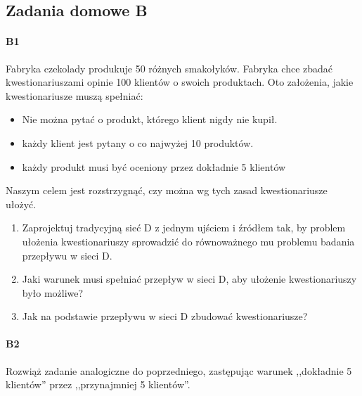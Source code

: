 \documentclass[a4paper,12pt]{article}
\theoremstyle{definition}%
\theoremstyle{definition}
\theoremstyle{problem}
\begin{document}
\subsection{Zadania domowe B}
\paragraph{B1} Fabryka czekolady produkuje 50 różnych smakołyków. Fabryka chce zbadać kwestionariuszami opinie 100 klientów o swoich produktach. Oto założenia, jakie kwestionariusze muszą
spełniać:
\begin{itemize}
\item Nie można pytać o produkt, którego klient nigdy nie kupił.
\item każdy klient jest pytany o co najwyżej 10 produktów.
\item każdy produkt musi być oceniony przez dokładnie 5 klientów
\end{itemize}
Naszym celem jest rozstrzygnąć, czy można wg tych zasad kwestionariusze ułożyć.
\begin{enumerate}[label=\alph*)]
\item Zaprojektuj tradycyjną sieć D z jednym ujściem i źródłem tak, by problem ułożenia kwestionariuszy
sprowadzić do równoważnego mu problemu badania przepływu w sieci D.
\item Jaki warunek musi spełniać przepływ w sieci D, aby ułożenie kwestionariuszy było możliwe?
\item Jak na podstawie przepływu w sieci D zbudować kwestionariusze?
\end{enumerate}

\paragraph{B2} Rozwiąż zadanie analogiczne do poprzedniego, zastępując warunek ,,dokładnie 5 klientów'' przez ,,przynajmniej 5 klientów''.
\end{document}
